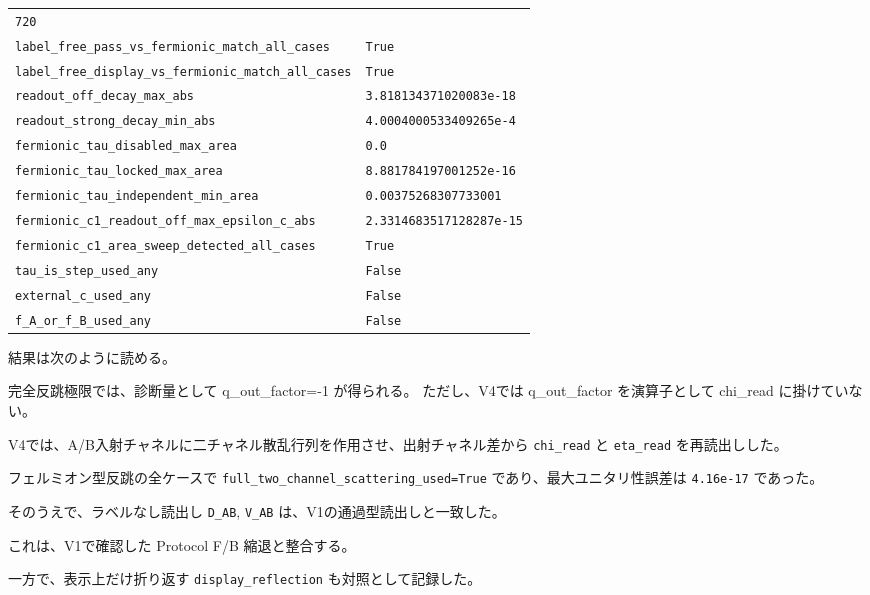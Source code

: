 \documentclass[
]{article}
\newenvironment{Shaded}{}{}
\newcommand{\NormalTok}[1]{#1}
\begin{document}
{\begin{longtable}[]{@{}
  >{\raggedright\arraybackslash}p{}
  >{\raggedleft\arraybackslash}p{}@{}}
\texttt{720} \\
\texttt{label\_free\_pass\_vs\_fermionic\_match\_all\_cases} &
\texttt{True} \\
\texttt{label\_free\_display\_vs\_fermionic\_match\_all\_cases} &
\texttt{True} \\
\texttt{readout\_off\_decay\_max\_abs} &
\texttt{3.818134371020083e-18} \\
\texttt{readout\_strong\_decay\_min\_abs} &
\texttt{4.0004000533409265e-4} \\
\texttt{fermionic\_tau\_disabled\_max\_area} & \texttt{0.0} \\
\texttt{fermionic\_tau\_locked\_max\_area} &
\texttt{8.881784197001252e-16} \\
\texttt{fermionic\_tau\_independent\_min\_area} &
\texttt{0.00375268307733001} \\
\texttt{fermionic\_c1\_readout\_off\_max\_epsilon\_c\_abs} &
\texttt{2.3314683517128287e-15} \\
\texttt{fermionic\_c1\_area\_sweep\_detected\_all\_cases} &
\texttt{True} \\
\texttt{tau\_is\_step\_used\_any} & \texttt{False} \\
\texttt{external\_c\_used\_any} & \texttt{False} \\
\texttt{f\_A\_or\_f\_B\_used\_any} & \texttt{False} \\
\end{longtable}
}

結果は次のように読める。

\begin{Shaded}
\begin{Highlighting}[]
\NormalTok{完全反跳極限では、診断量として q\_out\_factor={-}1 が得られる。}
\NormalTok{ただし、V4では q\_out\_factor を演算子として chi\_read に掛けていない。}
\end{Highlighting}
\end{Shaded}

V4では、A/B入射チャネルに二チャネル散乱行列を作用させ、出射チャネル差から
\texttt{chi\_read} と \texttt{eta\_read} を再読出しした。

フェルミオン型反跳の全ケースで
\texttt{full\_two\_channel\_scattering\_used=True}
であり、最大ユニタリ性誤差は \texttt{4.16e-17} であった。

そのうえで、ラベルなし読出し \texttt{D\_AB}, \texttt{V\_AB}
は、V1の通過型読出しと一致した。

これは、V1で確認した Protocol F/B 縮退と整合する。

一方で、表示上だけ折り返す \texttt{display\_reflection}
も対照として記録した。
\end{document}
